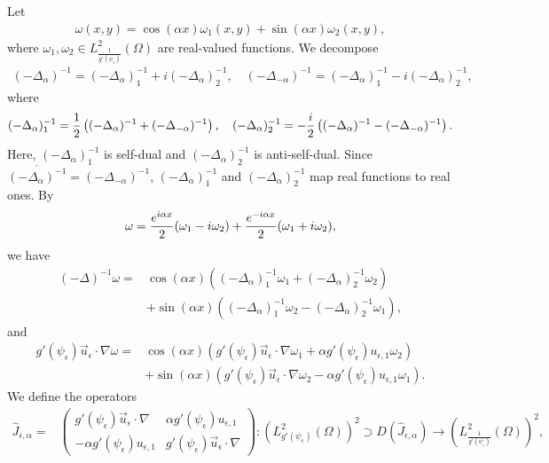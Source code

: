 \documentclass[1 [leqno, 11pt]{amsart}
\numberwithin{equation}{section}
\let\ep=\epsilon
\begin{document}
\begin{CJK*}{GBK}{song}
Let
\begin{align}\label{omega-triangle functions}
\omega(x,y)=\cos(\alpha x)\omega_1(x,y)+\sin(\alpha x)\omega_2(x,y),
\end{align}
where $\omega_1,\omega_2\in L^2_{\frac{1}{g'(\psi_\ep)}}(\Omega)$ are real-valued functions. We decompose
\begin{align*}
(-\Delta_\alpha)^{-1}=(-\Delta_\alpha)_1^{-1}+i(-\Delta_\alpha)_2^{-1},\quad(-\Delta_{-\alpha})^{-1}=(-\Delta_{\alpha})_1^{-1}-i(-\Delta_{\alpha})_2^{-1},
\end{align*}
where
\begin{align*}
(-\Delta_\alpha)_1^{-1}={1\over2} \left((-\Delta_\alpha)^{-1}+(-\Delta_{-\alpha})^{-1}\right),\quad
(-\Delta_{\alpha})_2^{-1}=-{i\over2} \left((-\Delta_\alpha)^{-1}-(-\Delta_{-\alpha})^{-1}\right).
\end{align*}
Here, $(-\Delta_\alpha)_1^{-1}$ is self-dual and $(-\Delta_{\alpha})_2^{-1}$ is anti-self-dual.
Since $\overline{(-\Delta_\alpha)^{-1}}=(-\Delta_{-\alpha})^{-1}$, $(-\Delta_\alpha)_1^{-1}$ and
$(-\Delta_{\alpha})_2^{-1}$ map real functions to real ones. By
\begin{align}\label{omega-i-1-2}
\omega={e^{i\alpha x}\over2}(\omega_1-i\omega_2)+{e^{-i\alpha x}\over 2}(\omega_1+i\omega_2),
\end{align}
we have
\begin{align}\nonumber
(-\Delta)^{-1}\omega=&\cos(\alpha x)\left((-\Delta_\alpha)_1^{-1}\omega_1+(-\Delta_\alpha)_2^{-1}\omega_2\right)\\\label{omega-neg-lap-triangle functions}
&+\sin(\alpha x)\left((-\Delta_\alpha)_1^{-1}\omega_2-(-\Delta_{\alpha})_2^{-1}\omega_1\right),
\end{align}
and
\begin{align}\nonumber
g'(\psi_\epsilon)\vec{u}_\epsilon\cdot\nabla \omega=&\cos(\alpha x)(g'(\psi_\epsilon)\vec{u}_\epsilon\cdot\nabla \omega_1+\alpha g'(\psi_\epsilon)u_{\ep,1}\omega_2)\\\label{g-der-nabla-triangle functions}
&+\sin(\alpha x)(g'(\psi_\epsilon)\vec{u}_\epsilon\cdot\nabla\omega_2-\alpha g'(\psi_\epsilon)u_{\ep,1}\omega_1).
\end{align}
We define the operators
\begin{align*}
\hat{J}_{\ep,\alpha}=&\left( \begin{array}{cc} g'(\psi_\epsilon)\vec{u}_\epsilon\cdot\nabla & \alpha g'(\psi_\epsilon)u_{\ep,1}\\ -\alpha g'(\psi_\epsilon)u_{\ep,1} & g'(\psi_\epsilon)\vec{u}_\epsilon\cdot\nabla \end{array} \right): \left(L^2_{g'(\psi_\ep)}(\Omega)\right)^2 \supset D(\hat{J}_{\epsilon, \alpha}) \to \left(L^2_{\frac{1}{g'(\psi_\ep)}}(\Omega)\right)^2,\\

\end{align*}
\end{CJK*}
\end{document}
